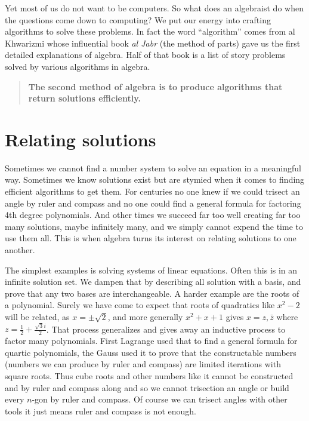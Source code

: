 Yet most of us do not want to be computers.  So what does an algebraist do 
when the questions come down to computing?  We put our energy into crafting 
algorithms to solve these problems.  In fact the word ``algorithm'' comes 
from al Khwarizmi whose influential book \emph{al Jabr} (the method of parts)
gave us the first detailed explanations of algebra.  Half of that book 
is a list of story problems solved by various algorithms in algebra.
\begin{quote}
    \textbf{The second method of algebra is to produce algorithms 
    that return solutions efficiently.}
\end{quote}


\section{Relating solutions}
Sometimes we cannot find a number system to solve an equation
in a meaningful way.  Sometimes we know solutions exist but are stymied 
when it comes to finding efficient algorithms to get them.  For centuries 
no one knew if we could trisect an angle by ruler and compass and no one 
could find a general formula for factoring 4th degree polynomials.  And other 
times we succeed far too well creating far too many solutions, 
maybe infinitely many, and we simply cannot expend the time to use them all.
This is when algebra turns its interest on relating solutions to one another.

The simplest examples is solving systems of linear equations.  Often 
this is in an infinite solution set.  We dampen that by describing all 
solution with a basis, and prove that any two bases are interchangeable.
A harder example are the roots of a polynomial.  Surely we have come 
to expect that roots of quadratics like $x^2-2$ will be related, 
as $x=\pm \sqrt{2}$, and more generally $x^2+x+1$ gives 
$x=z,\bar{z}$ where $z=\frac{1}{2}+\frac{\sqrt{3}i}{2}$.  That process 
generalizes and gives away an inductive process to factor many polynomials.
First Lagrange used that to find a general formula for quartic polynomials,
the Gauss used it to prove that the constructable numbers (numbers we can 
produce by ruler and compass) are limited iterations with square roots.
Thus cube roots and other numbers like it cannot be constructed and by 
ruler and compass along and so we cannot trisection an angle or build 
every $n$-gon by ruler and compass.  Of course we can trisect angles with 
other tools it just means ruler and compass is not enough.

